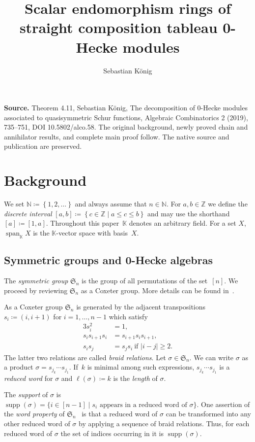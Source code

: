 \documentclass[10pt]{amsart}
\title[Endomorphism rings of tableau modules]{Scalar endomorphism rings of straight composition tableau 0-Hecke modules}
\author{Sebastian K\"onig}
\date{}
\theoremstyle{plain}
\theoremstyle{plain}
\theoremstyle{plain}
\theoremstyle{plain}
\theoremstyle{plain}
\theoremstyle{definition}
\theoremstyle{definition}
\newcommand{\N}{\mathbb N}
\newcommand{\Z}{\mathbb Z}
\newcommand{\K}{\mathbb K}
\DeclareMathOperator{\supp}{supp}
\newcommand{\set}[1]{\left\{ #1 \right\}}
\newcommand{\fS}{\mathfrak{S}}
\newcommand{\fs}{s}
\newcommand{\spa}{\operatorname{span}}
\begin{document}
\maketitle
\noindent\textbf{Source.} Theorem 4.11, Sebastian K\"onig, The decomposition of 0-Hecke modules associated to quasisymmetric Schur functions, Algebraic Combinatorics 2 (2019), 735--751, DOI 10.5802/alco.58. The original background, newly proved chain and annihilator results, and complete main proof follow. The native source and publication are preserved.
\setcounter{section}{1}
\section{Background}
\label{sec:preliminaries}

We set $\N \coloneqq \set{1,2,\dots}$ and always assume that $n\in \N$. For $a,b\in \Z$ we define the \emph{discrete interval} $[a,b]\coloneqq \set{c\in \Z\mid a\leq c \leq b}$ and may use the shorthand $[a] \coloneqq [1,a]$. 
Throughout this paper~$\K$ denotes an arbitrary field. For a set $X$, $\spa_\K X$ is the $\K$-vector space with basis~$X$.

\subsection{Symmetric groups and 0-Hecke algebras}

The \emph{symmetric group} $\fS_n$ is the group of all permutations of the set~$[n]$. We proceed by reviewing $\fS_n$ as a Coxeter group. More details can be found in~\cite{Bjorner2006}.

As a Coxeter group $\fS_n$ is generated by the adjacent transpositions $\fs_i \coloneqq (i,i+1)$ for $i= 1,\dots, n-1$ which satisfy
\begin{alignat*}{3}
\fs_i^2 &= 1, 			\\
\fs_i\fs_{i+1}\fs_i &= \fs_{i+1}\fs_i\fs_{i+1}, 	\\
\fs_i\fs_j &= \fs_j \fs_i 		\ \text{if } |i-j|\geq 2. 
\end{alignat*}
The latter two relations are called \emph{braid relations}.
Let $\sigma \in \fS_n$. We can write $\sigma$ as a product $\sigma = s_{j_k} \cdots s_{j_1}$.
If~$k$ is minimal among such expressions, $s_{j_k} \cdots s_{j_1}$ is a \emph{reduced word} for $\sigma$ and $\ell(\sigma) \coloneqq k$ is the \emph{length} of $\sigma$. 

The \emph{support} of $\sigma$ is $\supp(\sigma) =\{ i\in [n-1] \mid \text{$\fs_i$ appears in a reduced word of $\sigma$}\}$.
One assertion of the \emph{word property} of $\fS_n$~\cite[Theorem~3.3.1]{Bjorner2006} is that a reduced word of $\sigma$ can be transformed into any other reduced word of $\sigma$ by applying a sequence of braid relations. 
Thus, for each reduced word of $\sigma$ the set of indices occurring in it is $\supp(\sigma)$.
\end{document}
